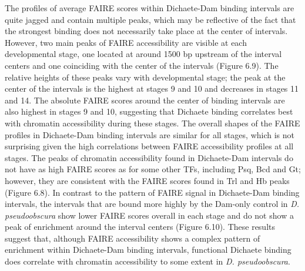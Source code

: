 The profiles of average FAIRE scores within Dichaete-Dam binding intervals are quite jagged and contain multiple peaks, which may be reflective of the fact that the strongest binding does not necessarily take place at the center of intervals. However, two main peaks of FAIRE accessibility are visible at each developmental stage, one located at around 1500 bp upstream of the interval centers and one coinciding with the center of the intervals (Figure 6.9). The relative heights of these peaks vary with developmental stage; the peak at the center of the intervals is the highest at stages 9 and 10 and decreases in stages 11 and 14. The absolute FAIRE scores around the center of binding intervals are also highest in stages 9 and 10, suggesting that Dichaete binding correlates best with chromatin accessibility during these stages. The overall shapes of the FAIRE profiles in Dichaete-Dam binding intervals are similar for all stages, which is not surprising given the high correlations between FAIRE accessibility profiles at all stages. The peaks of chromatin accessibility found in Dichaete-Dam intervals do not have as high FAIRE scores as for some other TFs, including Psq, Bcd and Gt; however, they are consistent with the FAIRE scores found in Trl and Hb peaks (Figure 6.8). In contrast to the pattern of FAIRE signal in Dichaete-Dam binding intervals, the intervals that are bound more highly by the Dam-only control in \emph{D. pseudoobscura} show lower FAIRE scores overall in each stage and do not show a peak of enrichment around the interval centers (Figure 6.10). These results suggest that, although FAIRE accessibility shows a complex pattern of enrichment within Dichaete-Dam binding intervals, functional Dichaete binding does correlate with chromatin accessibility to some extent in \emph{D. pseudoobscura}.\\

